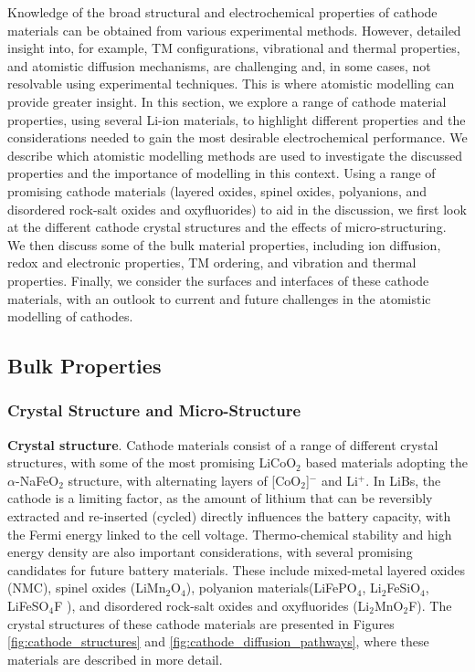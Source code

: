 \documentclass[../main.tex]{subfiles}
\begin{document}
Knowledge of the broad structural and electrochemical properties of cathode materials can be obtained from various experimental methods. However, detailed insight into, for example, TM configurations, vibrational and thermal properties, and atomistic diffusion mechanisms, are challenging and, in some cases, not resolvable using experimental techniques. This is where atomistic modelling can provide greater insight. In this section, we explore a range of cathode material properties, using several Li-ion materials, to highlight different properties and the considerations needed to gain the most desirable electrochemical performance. We describe which atomistic modelling methods are used to investigate the discussed properties and the importance of modelling in this context. Using a range of promising cathode materials (layered oxides, spinel oxides, polyanions, and disordered rock-salt oxides and oxyfluorides) to aid in the discussion, we first look at the different cathode crystal structures and the effects of micro-structuring. We then discuss some of the bulk material properties, including ion diffusion, redox and electronic properties, TM ordering, and vibration and thermal properties. Finally, we consider the surfaces and interfaces of these cathode materials, with an outlook to current and future challenges in the atomistic modelling of cathodes.

\subsection{Bulk Properties}
\subsubsection{Crystal Structure and Micro-Structure}
\textbf{Crystal structure}. Cathode materials consist of a range of different crystal structures, with some of the most promising LiCoO$_2$ based materials adopting the $\alpha$-NaFeO$_2$ structure, with alternating layers of [CoO$_2$]$^-$ and Li$^+$. In LiBs, the cathode is a limiting factor, as the amount of lithium that can be reversibly extracted and re-inserted (cycled) directly influences the battery capacity, with the Fermi energy linked to the cell voltage. \cite{islam2014lithium} Thermo-chemical stability and high energy density are also important considerations, with several promising candidates for future battery materials. These include mixed-metal layered oxides (NMC), spinel oxides (LiMn$_2$O$_4$), polyanion materials(LiFePO$_4$, \cite{whittingham2008materials,masquelier2013polyanionic,goodenough_li-ion_2013, zaghib2013review} Li$_2$FeSiO$_4$, \cite{nyten2005electrochemical,sirisopanaporn2011polymorphism,islam2011silicate} LiFeSO$_4$F \cite{padhi1997mapping}), and disordered rock-salt oxides and oxyfluorides (Li$_2$MnO$_2$F\cite{Jacquet2019, clement2020, Chang2020, Tygesen2020, Sharpe2020}). The crystal structures of these cathode materials are presented in Figures \ref{fig:cathode_structures} and \ref{fig:cathode_diffusion_pathways}, where these materials are described in more detail.
\end{document}
